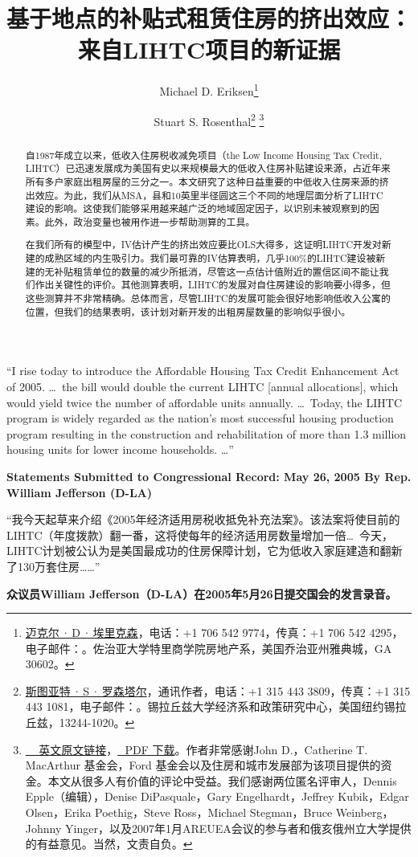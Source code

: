 \documentclass[lang=cn,11pt,a4paper]{paper}
\title{基于地点的补贴式租赁住房的挤出效应：来自LIHTC项目的新证据}
\author{Michael D. Eriksen\thanks{\href{http://www.eriksen.myweb.uga.edu}{迈克尔\,·\,D\,·\,埃里克森}，电话：+1 706 542 9774，传真：+1 706 542 4295，电子邮件：\email{eriksen@terry.uga.edu}。佐治亚大学特里商学院房地产系，美国乔治亚州雅典城，GA 30602。} \and Stuart S. Rosenthal\thanks{\href{http://www.faculty.maxwell.syr.edu/rosenthal}{斯图亚特\,·\,S\,·\,罗森塔尔}，通讯作者，电话：+1 315 443 3809，传真：+1 315 443 1081，电子邮件：\email{ssrosent@maxwell.syr.edu}。锡拉丘兹大学经济系和政策研究中心，美国纽约锡拉丘兹，13244-1020。}\; \thanks{\href{https://www.sciencedirect.com/science/article/pii/S0047272710000885}{~\faLink\,~英文原文链接}，\href{https://sci-hub.tw/10.1016/j.jpubeco.2010.07.002}{\faFilePdfO\,~PDF 下载}。作者非常感谢John D.，Catherine T. MacArthur 基金会，Ford 基金会以及住房和城市发展部为该项目提供的资金。本文从很多人有价值的评论中受益。我们感谢两位匿名评审人，Dennis Epple（编辑），Denise DiPasquale，Gary Engelhardt，Jeffrey Kubik，Edgar Olsen，Erika Poethig，Steve Ross，Michael Stegman，Bruce Weinberg，Johnny Yinger，以及2007年1月AREUEA会议的参与者和俄亥俄州立大学提供的有益意见。当然，文责自负。}}
\date{\zhtoday}
\begin{document}
\maketitle

\begin{abstract}
  \hspace{2\ccwd}自1987年成立以来，低收入住房税收减免项目（the Low Income Housing Tax Credit, LIHTC）已迅速发展成为美国有史以来规模最大的低收入住房补贴建设来源，占近年来所有多户家庭出租房屋的三分之一。本文研究了这种日益重要的中低收入住房来源的挤出效应。为此，我们从MSA，县和10英里半径圆这三个不同的地理层面分析了LIHTC建设的影响。这使我们能够采用越来越广泛的地域固定因子，以识别未被观察到的因素。此外，政治变量也被用作进一步帮助测算的工具。
  
  \!在我们所有的模型中，IV估计产生的挤出效应要比OLS大得多，这证明LIHTC开发对新建的成熟区域的内生吸引力。我们最可靠的IV估算表明，几乎100\%的LIHTC建设被新建的无补贴租赁单位的数量的减少所抵消，尽管这一点估计值附近的置信区间不能让我们作出关键性的评价。其他测算表明，LIHTC的发展对自住房建设的影响要小得多，但这些测算并不非常精确。总体而言，尽管LIHTC的发展可能会很好地影响低收入公寓的位置，但我们的结果表明，该计划对新开发的出租房屋数量的影响似乎很小。

\end{abstract}
\vspace{10pt}

\begin{tcolorbox}[
	colback=yellow!10!white,
  colframe=red!30!black,
  fontupper = \itshape,
]
“I rise today to introduce the Affordable Housing Tax Credit Enhancement Act of 2005. \dots~the bill would double the current LIHTC [annual allocations], which would yield twice the number of affordable units annually. \dots~Today, the LIHTC program is widely regarded as the nation's most successful housing production program resulting in the construction and rehabilitation of more than 1.3 million housing units for lower income households. \dots”
\vspace{5pt}

\textbf{Statements Submitted to Congressional Record: May 26, 2005 By Rep. William Jefferson (D-LA)}

\tcblower

“我今天起草来介绍《2005年经济适用房税收抵免补充法案》。该法案将使目前的LIHTC（年度拨款）翻一番，这将使每年的经济适用房数量增加一倍\dots~今天，LIHTC计划被公认为是美国最成功的住房保障计划，它为低收入家庭建造和翻新了130万套住房\dots\dots”
\vspace{5pt}

\textbf{众议员William Jefferson（D-LA）在2005年5月26日提交国会的发言录音。}

\end{tcolorbox}
\vspace{10pt}
\end{document}
